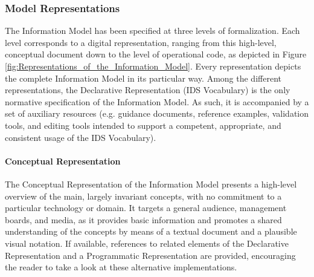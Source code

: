 \subsubsection{Model Representations}
The Information Model has been specified at three levels of formalization. Each level corresponds to a digital representation, ranging from this high-level, conceptual document down to the level of operational code, as depicted in Figure \ref{fig:Representations_of_the_Information_Model}. Every representation depicts the complete Information Model in its particular way. Among the different representations, the Declarative Representation (IDS Vocabulary) is the only normative specification of the Information Model. As such, it is accompanied by a set of auxiliary resources (e.g. guidance documents, reference examples, validation tools, and editing tools intended to support a competent, appropriate, and consistent usage of the IDS Vocabulary).


\paragraph{Conceptual Representation \\}
The Conceptual Representation of the Information Model presents a high-level overview of the main, largely invariant concepts, with no commitment to a particular technology or domain. It targets a general audience, management boards, and media, as it provides basic information and promotes a shared understanding of the concepts by means of a textual document and a plausible visual notation. If available, references to related elements of the Declarative Representation and a Programmatic Representation are provided, encouraging the reader to take a look at these alternative implementations.

